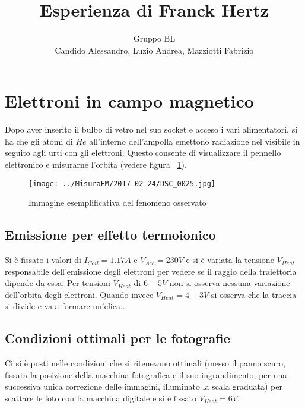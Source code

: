 \documentclass[10pt,a4paper]{article}
\title{Esperienza di Franck Hertz}
\author{Gruppo BL \\ Candido Alessandro, Luzio Andrea, Mazziotti Fabrizio}
\begin{document}
\maketitle

\section{Elettroni in campo magnetico}
Dopo aver inserito il bulbo di vetro nel suo socket e acceso i vari alimentatori, si ha che gli atomi di $He$ all'interno dell'ampolla emettono radiazione nel visibile in seguito agli urti con gli elettroni. Questo consente di visualizzare il pennello elettronico e misurarne l'orbita (vedere figura \figurename{~\ref{fig:ex1}}).

\begin{figure}[H]
	\centering
	\texttt{[image: ../MisuraEM/2017-02-24/DSC\_0025.jpg]}
	\caption{Immagine esemplificativa del fenomeno osservato}
	\label{fig:ex1}
\end{figure}

\subsection{Emissione per effetto termoionico}

Si è fissato i valori di $I_{Coil} = \unit{1.17}{A}$ e $V_{Acc} = \unit{230}{V}$ e si è variata la tensione $V_{Heat}$ responsabile dell'emissione degli elettroni per vedere se il raggio della traiettoria dipende da essa.
Per tensioni $V_{Heat}$ di $\unit{6-5}{V}$ non si osserva nessuna variazione dell'orbita degli elettroni. Quando invece $V_{Heat} = \unit{4-3}{V}$ si osserva che la traccia si divide e va a formare un'elica..

\subsection{Condizioni ottimali per le fotografie}

Ci si è posti nelle condizioni che si ritenevano ottimali (messo il panno scuro, fissata la posizione della macchina fotografica e il suo ingrandimento, per una successiva unica correzione delle immagini, illuminato la scala graduata) per scattare le foto con la macchina digitale e si è fissato $V_{Heat} = \unit{6}{V}$. 
\end{document}
